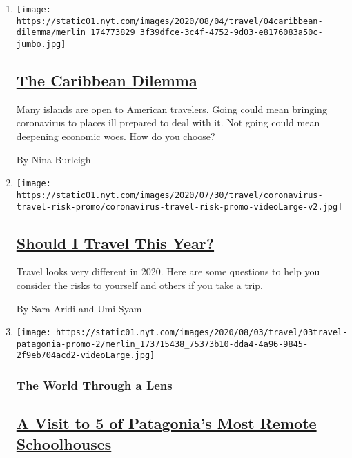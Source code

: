 \begin{enumerate}
\def\labelenumi{\arabic{enumi}.}
\item
  \texttt{[image: https://static01.nyt.com/images/2020/08/04/travel/04caribbean-dilemma/merlin\_174773829\_3f39dfce-3c4f-4752-9d03-e8176083a50c-jumbo.jpg]}

  \hypertarget{the-caribbean-dilemma}{%
  \subsection{\texorpdfstring{\href{/2020/08/04/travel/coronavirus-caribbean-vacations.html}{The
  Caribbean
  Dilemma}}{The Caribbean Dilemma}}\label{the-caribbean-dilemma}}

  Many islands are open to American travelers. Going could mean bringing
  coronavirus to places ill prepared to deal with it. Not going could
  mean deepening economic woes. How do you choose?

  By Nina Burleigh
\item
  \texttt{[image: https://static01.nyt.com/images/2020/07/30/travel/coronavirus-travel-risk-promo/coronavirus-travel-risk-promo-videoLarge-v2.jpg]}

  \hypertarget{should-i-travel-this-year}{%
  \subsection{\texorpdfstring{\href{/interactive/2020/07/31/travel/coronavirus-travel-risk.html}{Should
  I Travel This
  Year?}}{Should I Travel This Year?}}\label{should-i-travel-this-year}}

  Travel looks very different in 2020. Here are some questions to help
  you consider the risks to yourself and others if you take a trip.

  By Sara Aridi and Umi Syam
\item
  \texttt{[image: https://static01.nyt.com/images/2020/08/03/travel/03travel-patagonia-promo-2/merlin\_173715438\_75373b10-dda4-4a96-9845-2f9eb704acd2-videoLarge.jpg]}

  \hypertarget{the-world-through-a-lens}{%
  \subsubsection{The World Through a
  Lens}\label{the-world-through-a-lens}}

  \hypertarget{a-visit-to-5-of-patagonias-most-remote-schoolhouses}{%
  \subsection{\texorpdfstring{\href{/2020/08/03/travel/remote-schools-patagonia.html}{A
  Visit to 5 of Patagonia's Most Remote
  Schoolhouses}}{A Visit to 5 of Patagonia's Most Remote Schoolhouses}}\label{a-visit-to-5-of-patagonias-most-remote-schoolhouses}}


\end{enumerate}
